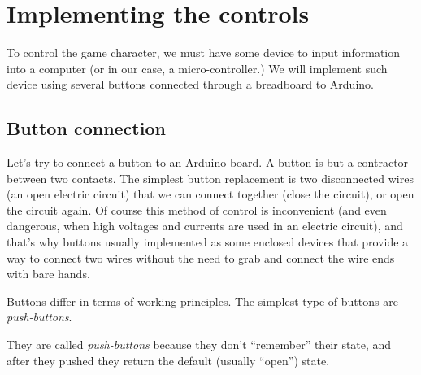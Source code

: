 \documentclass[../sparc.tex]{subfiles}
\begin{document}
\section{Implementing the controls}
\label{section:game-dev-controls}

To control the game character, we must have some device to input information
into a computer (or in our case, a micro-controller.)  We will implement such
device using several buttons connected through a breadboard to Arduino.

\subsection{Button connection}

Let's try to connect a button to an Arduino board.  A button is but a contractor
between two contacts.  The simplest button replacement is two disconnected wires
(an open electric circuit) that we can connect together (close the circuit), or
open the circuit again.  Of course this method of control is inconvenient (and
even dangerous, when high voltages and currents are used in an electric
circuit), and that's why buttons usually implemented as some enclosed devices
that provide a way to connect two wires without the need to grab and connect the
wire ends with bare hands.

Buttons differ in terms of working principles.  The simplest type of buttons are
\emph{push-buttons}.

They are called \emph{push-buttons} because they don't ``remember'' their state,
and after they pushed they return the default (usually ``open'') state.
\end{document}
